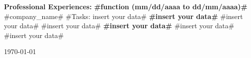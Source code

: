 \documentclass[a4paper,10pt]{report}
\begin{document}
\begin{flushleft}
   \linebreak
  \textbf{Professional Experiences:}
  \vspace*{0.5\baselineskip}
  \linebreak
  \textbf{#function (mm/dd/aaaa to dd/mm/aaaa)#}
  \linebreak
  #company_name#
  \linebreak
  #Tasks: insert your data#
  \vspace*{0.5\baselineskip}
  \linebreak
  \textbf{#insert your data#}
  \linebreak
  #insert your data#
  \linebreak
  #insert your data#
  \vspace*{0.5\baselineskip}
  \linebreak
  \textbf{#insert your data#}
  \linebreak
  #insert your data#
  \linebreak
  #insert your data#
  \vspace*{0.5\baselineskip}
  \linebreak
  \end{flushleft}
  \begin{center}
    \today
\end{center}
\end{document}
